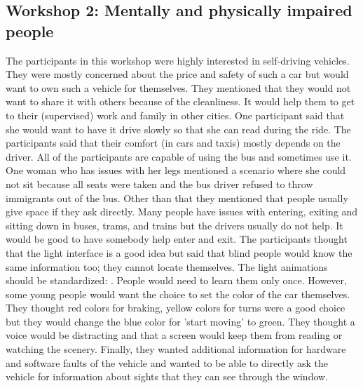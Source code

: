 \subsection{Workshop 2: Mentally and physically impaired people}
The participants in this workshop were highly interested in self-driving vehicles. They were mostly concerned about the price and safety of such a car but would want to own such a vehicle for themselves. They mentioned that they would not want to share it with others because of the cleanliness. It would help them to get to their (supervised) work and family in other cities. One participant said that she would want to have it drive slowly so that she can read during the ride. The participants said that their comfort (in cars and taxis) mostly depends on the driver. All of the participants are capable of using the bus and sometimes use it. One woman who has issues with her legs mentioned a scenario where she could not sit because all seats were taken and the bus driver refused to throw immigrants out of the bus. Other than that they mentioned that people usually give space if they ask directly. Many people have issues with entering, exiting and sitting down in buses, trams, and trains but the drivers usually do not help. It would be good to have somebody help enter and exit. The participants thought that the light interface is a good idea but said that blind people would know the same information too; they cannot locate themselves. The light animations should be standardized: . People would need to learn them only once. However, some young people would want the choice to set the color of the car themselves. They thought red colors for braking, yellow colors for turns were a good choice but they would change the blue color for 'start moving' to green.  They thought a voice would be distracting and that a screen would keep them from reading or watching the scenery. Finally, they wanted additional information for hardware and software faults of the vehicle and wanted to be able to directly ask the vehicle for information about sights that they can see through the window.



